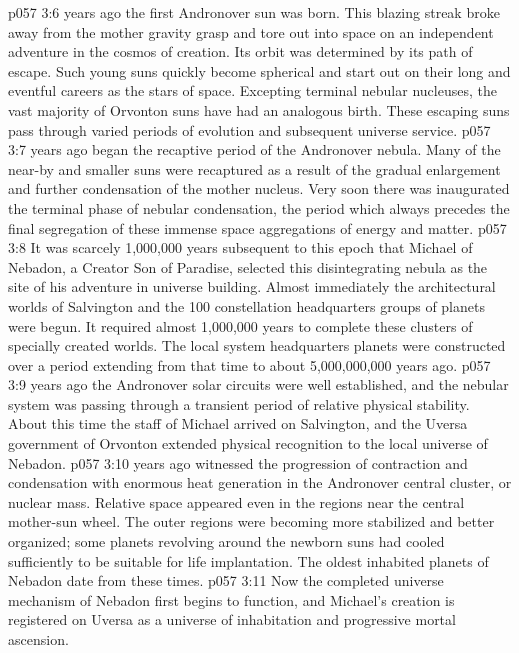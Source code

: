\vs p057 3:6 \pc {} years ago the first Andronover sun was born. This blazing streak broke away from the mother gravity grasp and tore out into space on an independent adventure in the cosmos of creation. Its orbit was determined by its path of escape. Such young suns quickly become spherical and start out on their long and eventful careers as the stars of space. Excepting terminal nebular nucleuses, the vast majority of Orvonton suns have had an analogous birth. These escaping suns pass through varied periods of evolution and subsequent universe service.
\vs p057 3:7 \pc {} years ago began the recaptive period of the Andronover nebula. Many of the near\hyp{}by and smaller suns were recaptured as a result of the gradual enlargement and further condensation of the mother nucleus. Very soon there was inaugurated the terminal phase of nebular condensation, the period which always precedes the final segregation of these immense space aggregations of energy and matter.
\vs p057 3:8 It was scarcely 1,000,000 years subsequent to this epoch that Michael of Nebadon, a Creator Son of Paradise, selected this disintegrating nebula as the site of his adventure in universe building. Almost immediately the architectural worlds of Salvington and the 100 constellation headquarters groups of planets were begun. It required almost 1,000,000 years to complete these clusters of specially created worlds. The local system headquarters planets were constructed over a period extending from that time to about 5,000,000,000 years ago.
\vs p057 3:9 \pc {} years ago the Andronover solar circuits were well established, and the nebular system was passing through a transient period of relative physical stability. About this time the staff of Michael arrived on Salvington, and the Uversa government of Orvonton extended physical recognition to the local universe of Nebadon.
\vs p057 3:10 \pc {} years ago witnessed the progression of contraction and condensation with enormous heat generation in the Andronover central cluster, or nuclear mass. Relative space appeared even in the regions near the central mother\hyp{}sun wheel. The outer regions were becoming more stabilized and better organized; some planets revolving around the newborn suns had cooled sufficiently to be suitable for life implantation. The oldest inhabited planets of Nebadon date from these times.
\vs p057 3:11 Now the completed universe mechanism of Nebadon first begins to function, and Michael’s creation is registered on Uversa as a universe of inhabitation and progressive mortal ascension.
